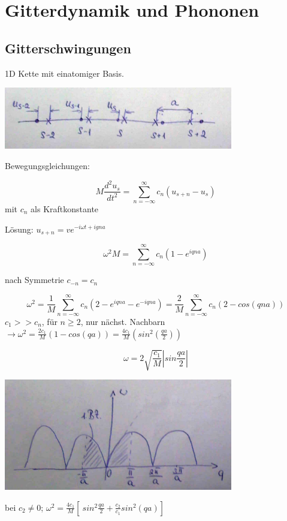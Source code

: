 



\tableofcontents
\setcounter{chapter}{5}
\chapter{Gitterdynamik und Phononen}

\section{Gitterschwingungen}

1D Kette mit einatomiger Basis. 

\includegraphics[width=0.75\textwidth]{kap06_01.png}

Bewegungsgleichungen:

\[ M\frac{d^2 u_s}{dt^2} = \sum^{\infty}_{n=-\infty}c_n(u_{s+n}-u_s)\]
mit \(c_n\) als Kraftkonstante

Lösung: \(u_{s+n}=v e^{-i\omega t + igna}\)

\[\omega^2 M = \sum^{\infty}_{n=-\infty}c_n(1-e^{iqna})\]

nach Symmetrie \(c_{-n}=c_n\)

\[\omega^2 = \frac{1}{M} \sum^{\infty}_{n=-\infty}c_n(2-e^{iqna}-e^{-iqna})=\frac{2}{M} \sum^{\infty}_{n=-\infty}c_n(2-cos(qna))\]
\(c_1 >> c_n\), für  \(n\geq 2\), nur nächst. Nachbarn \(\rightarrow \omega^2=\frac{2c_1}{M} (1-cos(qa)) =\frac{4c_1}{M} (sin^2(\frac{qa}{2}))\)

\[\omega = 2\sqrt{\frac{c_1}{M}}\left| sin\frac{qa}{2}\right|\]

\includegraphics[width=0.75\textwidth]{kap06_02.png}

bei \(c_2\neq 0\); \(\omega^2 = \frac{4c_1}{M}\left[\ sin^2\frac{qa}{2} + \frac{c_2}{c_1}sin^2(qa) \right]\)

